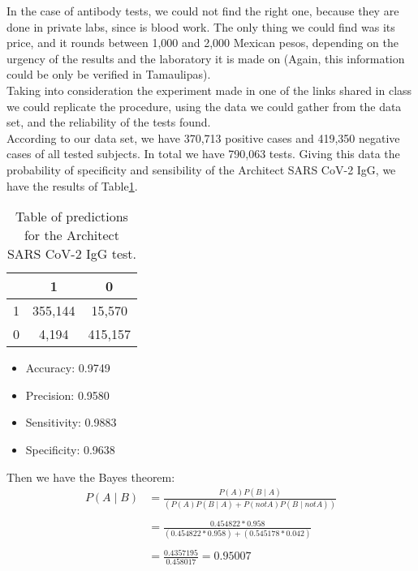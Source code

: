 \documentclass{article}
\begin{document}
 In the case of antibody tests, we could not find the right one, because they are done in private labs, since is blood work. The only thing we could find was its price, and it rounds between 1,000 and 2,000 Mexican pesos, depending on the urgency of the results and the laboratory it is made on (Again, this information could be only be verified in Tamaulipas).\\
 
 Taking into consideration the experiment made in one of the links shared in class \cite{tds} we could replicate the procedure, using the data we could gather from the data set, and the reliability of the tests found.\\
 
 According to our data set, we have 370,713 positive cases and 419,350 negative cases of all tested subjects. In total we have 790,063 tests. Giving this data the probability of specificity and sensibility of the Architect SARS CoV-2 IgG, we have the results of Table\ref{tab2}.\\
 
 \begin{table}[]\caption{Table of predictions for the Architect SARS CoV-2 IgG test.}\label{tab2}
\centering
\begin{tabular}{| l | c | c |}
\hline
 & 1 & 0\\
\hline 
1&355,144 &15,570\\
\hline 
0&4,194&415,157\\
\hline
\end{tabular}
\end{table}


\begin{itemize}
\item Accuracy: 0.9749
\item Precision: 0.9580
\item Sensitivity: 0.9883
\item Specificity: 0.9638
\end{itemize}

Then we have the Bayes theorem:\\
\begin{equation}
\label{eq:bayes}
\begin{split}
P(A \mid B)& =\frac{ P(A) P(B \mid A)} { (P(A)P(B\mid A) + P(not A) P(B \mid not A))}\\~\\
&= \frac{0.454822 * 0.958}{(0.454822 * 0.958) + (0.545178 * 0.042)}\\~\\
&=\frac{0.4357195}{0.458017}=0.95007
\end{split}
\end{equation}
\end{document}
